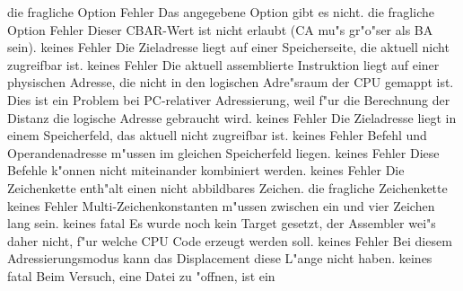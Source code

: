 \documentclass[12pt,a4paper,twoside]{report}
\begin{document}
\begin{description}
               {die fragliche Option}
               {Fehler}
               {Das angegebene Option gibt es nicht.}
               {die fragliche Option}
               {Fehler}
               {Dieser CBAR-Wert ist nicht erlaubt (CA mu"s gr"o"ser als BA sein).}
               {keines}
               {Fehler}
               {Die Zieladresse liegt auf einer Speicherseite, die aktuell nicht
                zugreifbar ist.}
               {keines}
               {Fehler}
               {Die aktuell assemblierte Instruktion liegt auf einer physischen
                Adresse, die nicht in den logischen Adre"sraum der CPU gemappt
                ist.  Dies ist ein Problem bei PC-relativer Adressierung, weil
                f"ur die Berechnung der Distanz die logische Adresse gebraucht
                wird.}
               {keines}
               {Fehler}
               {Die Zieladresse liegt in einem Speicherfeld, das aktuell nicht
                zugreifbar ist.}
               {keines}
               {Fehler}
               {Befehl und Operandenadresse m"ussen
                im gleichen Speicherfeld liegen.}
               {keines}
               {Fehler}
               {Diese Befehle k"onnen nicht miteinander kombiniert werden.}
               {keines}
               {Fehler}
               {Die Zeichenkette enth"alt einen nicht abbildbares Zeichen.}
               {die fragliche Zeichenkette}
               {keines}
               {Fehler}
               {Multi-Zeichenkonstanten m"ussen zwischen ein und vier Zeichen lang sein.}
               {keines}
               {fatal}
               {Es wurde noch kein Target gesetzt, der Assembler wei"s daher
                nicht, f"ur welche CPU Code erzeugt werden soll.}
               {keines}
               {Fehler}
               {Bei diesem Adressierungsmodus kann das Displacement diese
                L"ange nicht haben.}
               {keines}
               {fatal}
               {Beim Versuch, eine Datei zu "offnen, ist ein
}
\end{description}
\end{document}
